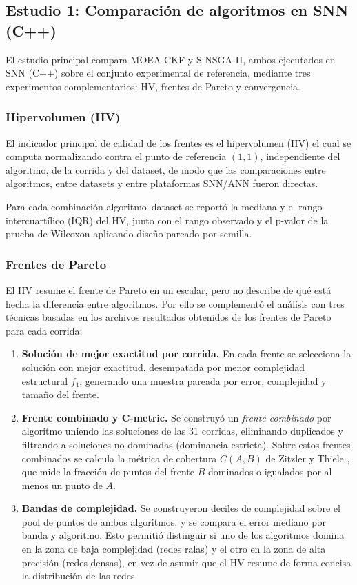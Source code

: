 \subsection{Estudio 1: Comparación de algoritmos en SNN (C++)}\label{sec:metodologia-estudio1}

El estudio principal compara MOEA-CKF y S-NSGA-II, ambos ejecutados en SNN (C++) sobre el conjunto experimental de referencia, mediante tres experimentos complementarios: HV, frentes de Pareto y convergencia.

\subsubsection{Hipervolumen (HV)}

El indicador principal de calidad de los frentes es el hipervolumen (HV) el cual se computa normalizando contra el punto de referencia \((1,1)\), independiente del algoritmo, de la corrida y del dataset, de modo que las comparaciones entre algoritmos, entre datasets y entre plataformas SNN/ANN fueron directas.

Para cada combinación algoritmo--dataset se reportó la mediana y el rango intercuartílico (IQR) del HV, junto con el rango observado y el p-valor de la prueba de Wilcoxon aplicando diseño pareado por semilla.

\subsubsection{Frentes de Pareto}

El HV resume el frente de Pareto en un escalar, pero no describe de qué está hecha la diferencia entre algoritmos. Por ello se complementó el análisis con tres técnicas basadas en los archivos resultados obtenidos de los frentes de Pareto para cada corrida:

\begin{enumerate}
    \item \textbf{Solución de mejor exactitud por corrida.} En cada frente se selecciona la solución con mejor exactitud, desempatada por menor complejidad estructural $f_1$, generando una muestra pareada por error, complejidad y tamaño del frente.
    \item \textbf{Frente combinado y C-metric.} Se construyó un \textit{frente combinado} por algoritmo uniendo las soluciones de las 31 corridas, eliminando duplicados y filtrando a soluciones no dominadas (dominancia estricta). Sobre estos frentes combinados se calcula la métrica de cobertura \(C(A,B)\) de Zitzler y Thiele \cite{Zitzler2007HV_revisited}, que mide la fracción de puntos del frente \(B\) dominados o igualados por al menos un punto de \(A\).
    \item \textbf{Bandas de complejidad.} Se construyeron deciles de complejidad sobre el pool de puntos de ambos algoritmos, y se compara el error mediano por banda y algoritmo. Esto permitió distinguir si uno de los algoritmos domina en la zona de baja complejidad (redes ralas) y el otro en la zona de alta precisión (redes densas), en vez de asumir que el HV resume de forma concisa la distribución de las redes.
\end{enumerate}


